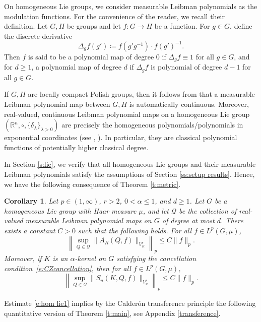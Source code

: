 \documentclass[12pt,reqno,a4paper,dvipsnames]{amsart}
\theoremstyle{plain}
\newtheorem{cor}[theorem]{Corollary}
\theoremstyle{definition}
\numberwithin{theorem}{section}
\numberwithin{equation}{section}
\begin{document}
On homogeneous Lie groups, we consider measurable Leibman polynomials \cite{leibman} as the modulation functions. For the convenience of the reader, we recall their definition. Let $G,H$ be groups and let $f\colon G\to H$ be a function. For $g\in G$, define the discrete derivative
\[
\Delta_g f(g')\coloneqq f(g'g^{-1}) \cdot f(g')^{-1}. 
\]
Then $f$ is said to be a polynomial map of degree $0$ if $\Delta_g f\equiv 1$ for all $g\in G$, and for $d\geq 1$, a polynomial map of degree $d$ if $\Delta_g f$ is polynomial of degree $d-1$ for all $g\in G$. 


If $G,H$ are locally compact Polish groups, then it follows from \cite[Theorem 1.5]{auto-cont} that a measurable Leibman polynomial map between $G,H$ is automatically continuous. 
Moreover, real-valued, continuous Leibman polynomial maps on a homogeneous Lie group $(\mathbb{R}^n, \circ, \{\delta_\lambda\}_{\lambda>0})$ are precisely the homogeneous polynomials/polynomials in exponential coordinates (see \cite[Corollary 1.4, Remark 4.2]{ledonne-poly}, \cite[Remark 6.2]{poly-cohomology}). In particular, they are classical polynomial functions of potentially higher classical degree.  


In Section \ref{s:lie}, we verify that all homogeneous Lie groups and their measurable Leibman polynomials satisfy the assumptions of Section \ref{ss:setup results}. Hence, we have the following consequence of Theorem \ref{t:metric}. 
 \begin{cor}\label{c:hom Lie}
Let $p \in (1,\infty)$, $r>2$, $0 < \alpha \le 1$, and $d\geq 1$. Let $G$ be a homogeneous Lie group with Haar measure $\mu$, and let $\mathcal{Q}$ be the collection of real-valued  measurable Leibman polynomial maps on $G$ of degree at most $d$. 
There exists a constant $C  > 0$ such that the following holds. For all $f \in L^p(G, \mu)$,
\begin{equation}\label{e:hom lie1}
    \left\| \sup_{Q \in \mathcal{Q}}
    \bigl\| A_R(Q, f) \bigr\|_{V^r_R} \right\|_p
    \le C \|f\|_p.
\end{equation}
Moreover, if $K$ is an $\alpha$-kernel on $G$ satisfying the cancellation condition~\eqref{e:CZcancellation}, then for all $f \in L^p(G,\mu)$,
\begin{equation}\label{e:hom lie2}
    \left\| \sup_{Q \in \mathcal{Q}}
    \bigl\| S_u(K, Q, f) \bigr\|_{V^r_u} \right\|_p
    \le C \|f\|_p.
\end{equation}
\end{cor}

Estimate \eqref{e:hom lie1} implies by the Calderón transference principle \cite{MR227354} the following quantitative version of Theorem \ref{t:main}, see Appendix \ref{transference}. 
\end{document}

